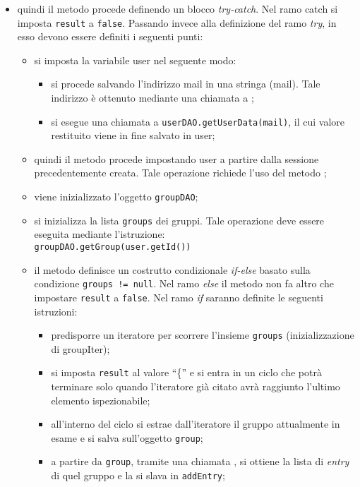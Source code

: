 \begin{description}
\begin{itemize}
		\item quindi il metodo procede definendo un blocco \textit{try-catch}. Nel ramo catch si imposta \texttt{result} a \texttt{false}. Passando invece alla definizione del ramo \textit{try}, in esso devono essere definiti i seguenti punti:
		\begin{itemize}
			\item si imposta la variabile user nel seguente modo:
			\begin{itemize}
				\item si procede salvando l'indirizzo mail in una stringa (mail). Tale indirizzo è ottenuto mediante una chiamata a ;
				\item si esegue una chiamata a \texttt{userDAO.getUserData(mail)}, il cui valore restituito viene in fine salvato in user;
			\end{itemize}
			\item quindi il metodo procede impostando user a partire dalla sessione precedentemente creata. Tale operazione richiede l'uso del metodo ;
			\item viene inizializzato l'oggetto \texttt{groupDAO};
			\item si inizializza la lista \texttt{groups} dei gruppi. Tale operazione deve essere eseguita mediante l'istruzione:\\
			\verb|groupDAO.getGroup(user.getId())|
			\item il metodo definisce un costrutto condizionale \textit{if-else} basato sulla condizione \texttt{groups != null}. Nel ramo \textit{else} il metodo non fa altro che impostare \texttt{result} a \texttt{false}. Nel ramo \textit{if} saranno definite le seguenti istruzioni:	
			\begin{itemize}
				\item predisporre un iteratore per scorrere l'insieme \texttt{groups} (inizializzazione di groupIter);
				\item si imposta \texttt{result} al valore ``\{'' e si entra in un ciclo  che potrà terminare solo quando l'iteratore già citato avrà raggiunto l'ultimo elemento ispezionabile;
				\item all'interno del ciclo si estrae dall'iteratore il gruppo attualmente in esame e si salva sull'oggetto \texttt{group};
				\item a partire da \texttt{group}, tramite una chiamata , si ottiene la lista di \textit{entry} di quel gruppo e la si slava in \texttt{addEntry};

\end{itemize}
\end{itemize}
\end{itemize}
\end{description}
